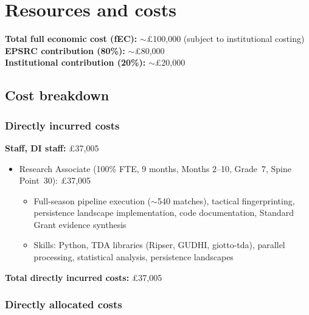 \section{Resources and costs}

\textbf{Total full economic cost (fEC):} $\sim$\pounds100{,}000 (subject to institutional costing) \\
\textbf{EPSRC contribution (80\%):} $\sim$\pounds80{,}000 \\
\textbf{Institutional contribution (20\%):} $\sim$\pounds20{,}000

\subsection{Cost breakdown}

\subsubsection{Directly incurred costs}

\textbf{Staff, DI staff:} \pounds37{,}005
\begin{itemize}
  \item Research Associate (100\% FTE, 9 months, Months 2--10, Grade~7, Spine Point~30): \pounds37{,}005
  \begin{itemize}[nosep]
    \item Full-season pipeline execution ($\sim$540 matches), tactical fingerprinting, persistence landscape implementation, code documentation, Standard Grant evidence synthesis
    \item Skills: Python, TDA libraries (Ripser, GUDHI, giotto-tda), parallel processing, statistical analysis, persistence landscapes
  \end{itemize}
\end{itemize}

\textbf{Total directly incurred costs:} \pounds37{,}005

\subsubsection{Directly allocated costs}

